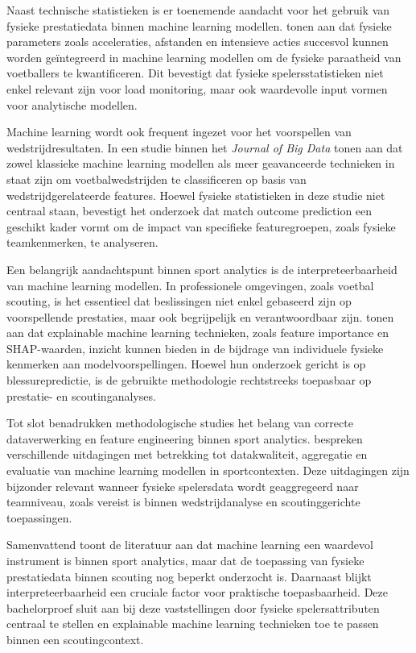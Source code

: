Naast technische statistieken is er toenemende aandacht voor het gebruik van fysieke prestatiedata binnen machine learning modellen. \textcite{Mandorino2023_PlayerReadiness} tonen aan dat fysieke parameters zoals acceleraties, afstanden en intensieve acties succesvol kunnen worden geïntegreerd in machine learning modellen om de fysieke paraatheid van voetballers te kwantificeren. Dit bevestigt dat fysieke spelersstatistieken niet enkel relevant zijn voor load monitoring, maar ook waardevolle input vormen voor analytische modellen.

Machine learning wordt ook frequent ingezet voor het voorspellen van wedstrijdresultaten. In een studie binnen het \textit{Journal of Big Data} tonen \textcite{BigData2024_SoccerOutcomePrediction} aan dat zowel klassieke machine learning modellen als meer geavanceerde technieken in staat zijn om voetbalwedstrijden te classificeren op basis van wedstrijdgerelateerde features. Hoewel fysieke statistieken in deze studie niet centraal staan, bevestigt het onderzoek dat match outcome prediction een geschikt kader vormt om de impact van specifieke featuregroepen, zoals fysieke teamkenmerken, te analyseren.

Een belangrijk aandachtspunt binnen sport analytics is de interpreteerbaarheid van machine learning modellen. In professionele omgevingen, zoals voetbal scouting, is het essentieel dat beslissingen niet enkel gebaseerd zijn op voorspellende prestaties, maar ook begrijpelijk en verantwoordbaar zijn. \textcite{CalderonDiaz2023_ExplainableML_Soccer} tonen aan dat explainable machine learning technieken, zoals feature importance en SHAP-waarden, inzicht kunnen bieden in de bijdrage van individuele fysieke kenmerken aan modelvoorspellingen. Hoewel hun onderzoek gericht is op blessurepredictie, is de gebruikte methodologie rechtstreeks toepasbaar op prestatie- en scoutinganalyses.

Tot slot benadrukken methodologische studies het belang van correcte dataverwerking en feature engineering binnen sport analytics. \textcite{Springer2024_MethodologyChallenges} bespreken verschillende uitdagingen met betrekking tot datakwaliteit, aggregatie en evaluatie van machine learning modellen in sportcontexten. Deze uitdagingen zijn bijzonder relevant wanneer fysieke spelersdata wordt geaggregeerd naar teamniveau, zoals vereist is binnen wedstrijdanalyse en scoutinggerichte toepassingen.

Samenvattend toont de literatuur aan dat machine learning een waardevol instrument is binnen sport analytics, maar dat de toepassing van fysieke prestatiedata binnen scouting nog beperkt onderzocht is. Daarnaast blijkt interpreteerbaarheid een cruciale factor voor praktische toepasbaarheid. Deze bachelorproef sluit aan bij deze vaststellingen door fysieke spelersattributen centraal te stellen en explainable machine learning technieken toe te passen binnen een scoutingcontext.


